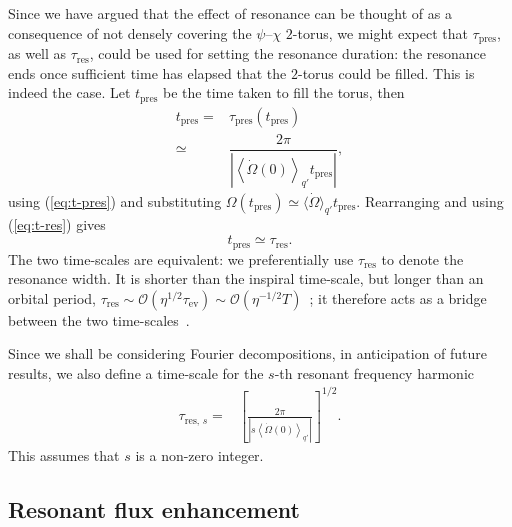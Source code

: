 \documentclass[aps,prd,amsfonts,amssymb,amsmath,nofootinbib,reprint,showpacs,superscriptaddress,twocolumn]{revtex4}
\newcommand{\eqnref}[1]{(\ref{eq:#1})}
\newcommand{\sub}[1]{\ensuremath{_\text{#1}}}
\newcommand{\order}[1]{\ensuremath{\mathcal{O}({#1})}}
\begin{document}
Since we have argued that the effect of resonance can be thought of as a consequence of not densely covering the $\psi$--$\chi$ $2$-torus, we might expect that $\tau\sub{pres}$, as well as $\tau\sub{res}$, could be used for setting the resonance duration: the resonance ends once sufficient time has elapsed that the $2$-torus could be filled. This is indeed the case. Let $t\sub{pres}$ be the time taken to fill the torus, then
\begin{align}
t\sub{pres} = {} & \tau\sub{pres}(t\sub{pres}) \\
 \simeq {} & \dfrac{2\pi}{\left|\left\langle\dot{\Omega}(0)\right\rangle_{q'} t\sub{pres}\right|}, \nonumber 
\end{align}
using \eqnref{t-pres} and substituting $\Omega(t\sub{pres}) \simeq \langle\dot{\Omega}\rangle_{q'} t\sub{pres}$. Rearranging and using \eqnref{t-res} gives
\begin{equation}
t\sub{pres} \simeq \tau\sub{res}.
\end{equation}
The two time-scales are equivalent: we preferentially use $\tau\sub{res}$ to denote the resonance width. It is shorter than the inspiral time-scale, but longer than an orbital period, $\tau\sub{res} \sim \order{\eta^{1/2}\tau\sub{ev}} \sim \order{\eta^{-1/2}T}$~\cite{Flanagan2012,Gair2011a}; it therefore acts as a bridge between the two time-scales~\cite{Hinderer2008}.

Since we shall be considering Fourier decompositions, in anticipation of future results, we also define a time-scale for the $s$-th resonant frequency harmonic
\begin{align}
\tau_{\mathrm{res},\,s} = {} & \left[\frac{2\pi}{\left|s\left\langle \dot{\Omega}(0)\right\rangle_{q'}\right|}\right]^{1/2}.
\label{eq:T-res-s}
\end{align}
This assumes that $s$ is a non-zero integer.

\subsection{Resonant flux enhancement}
\end{document}
